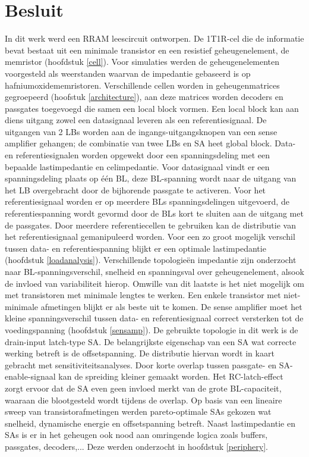 \chapter{Besluit}
\label{besluit}
In dit werk werd een RRAM leescircuit ontworpen. De 1T1R-cel die de informatie bevat bestaat uit een minimale transistor en een resistief geheugenelement, de memristor (hoofdstuk \ref{cell}). Voor simulaties werden de geheugenelementen voorgesteld als weerstanden waarvan de impedantie gebaseerd is op hafniumoxidememristoren. Verschillende cellen worden in geheugenmatrices gegroepeerd (hoofstuk \ref{architecture}), aan deze matrices worden decoders en passgates toegevoegd die samen een local block vormen. Een local block kan aan diens uitgang zowel een datasignaal leveren als een referentiesignaal. De uitgangen van 2 LBs worden aan de ingangs-uitgangsknopen van een sense amplifier gehangen; de combinatie van twee LBs en SA heet global block. Data- en referentiesignalen worden opgewekt door een spanningsdeling met een bepaalde lastimpedantie en celimpedantie. Voor datasignaal vindt er een spanningsdeling plaats op één BL, deze BL-spanning wordt naar de uitgang van het LB overgebracht door de bijhorende passgate te activeren. Voor het referentiesignaal worden er op meerdere BLs spanningsdelingen uitgevoerd, de referentiespanning wordt gevormd door de BLs kort te sluiten aan de uitgang met de passgates. Door meerdere referentiecellen te gebruiken kan de distributie van het referentiesignaal gemanipuleerd worden. Voor een zo groot mogelijk verschil tussen data- en referentiespanning blijkt er een optimale lastimpedantie (hoofdstuk \ref{loadanalysis}). Verschillende topologieën impedantie zijn onderzocht naar BL-spanningsverschil, snelheid en spanningsval over geheugenelement, alsook de invloed van variabiliteit hierop. Omwille van dit laatste is het niet mogelijk om met transistoren met minimale lengtes te werken. Een enkele transistor met niet-minimale afmetingen blijkt er als beste uit te komen. De sense amplifier moet het kleine spanningsverschil tussen data- en referentiesignaal correct versterken tot de voedingspanning (hoofdstuk \ref{sensamp}). De gebruikte topologie in dit werk is de drain-input latch-type SA. De belangrijkste eigenschap van een SA wat correcte werking betreft is de offsetspanning. De distributie hiervan wordt in kaart gebracht met sensitiviteitsanalyses. Door korte overlap tussen passgate- en SA-enable-signaal kan de spreiding kleiner gemaakt worden. Het RC-latch-effect zorgt ervoor dat de SA even geen invloed merkt van de grote BL-capaciteit, waaraan die blootgesteld wordt tijdens de overlap. Op basis van een lineaire sweep van transistorafmetingen werden  pareto-optimale SAs gekozen wat snelheid, dynamische energie en offsetspanning betreft. Naast lastimpedantie en SAs is er in het geheugen ook nood aan omringende logica zoals buffers, passgates, decoders,... Deze werden onderzocht in hoofdstuk \ref{periphery}.
